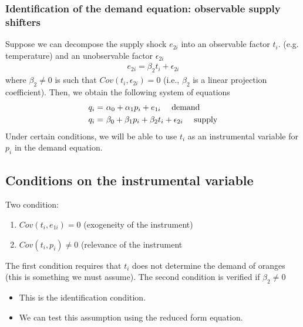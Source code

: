 \documentclass[a4paper,twoside,11pt]{article}
\begin{document}
\subsubsection{Identification of the demand equation: observable supply shifters}
Suppose we can decompose the supply shock $e_{2i}$ into an observable factor $t_i$. (e.g. temperature) and an unobservable factor $\epsilon_{2i}$
\begin{equation*}
\begin{aligned}
e_{2i} = \beta_2 t_i + \epsilon_{2i}
\end{aligned} 
\end{equation*}
where $\beta_2 \ne 0$ is such that $Cov(t_i, \epsilon_{2i}) =0$ (i.e., $\beta_2$ is a linear projection
coefficient).
\newline
\newline
Then, we obtain the following system of equations
\begin{equation*}
\begin{aligned}
q_i =& \ \alpha_0 + \alpha_1 p_i + e_{1i} \ \ \ \ \textmd{demand} \\
q_i =& \ \beta_0 + \beta_1 p_i + \beta_2 t_i + \epsilon_{2i} \ \ \ \ \textmd{supply}
\end{aligned} 
\end{equation*}
Under certain conditions, we will be able to use $t_i$ as an instrumental variable for $p_i$ in the demand equation.
\subsection{Conditions on the instrumental variable}
\begin{shaded*}
\noindent Two condition:
\begin{enumerate}
    \item $Cov(t_i, e_{1i}) =0$ (exogeneity of the instrument)
    \item $Cov(t_i,p_i) \ne 0$ (relevance of the instrument
\end{enumerate}
The first condition requires that $t_i$ does not determine the demand of oranges (this is something we must assume).
\newline
\newline
The second condition is verified if $\beta_2 \ne 0$
\begin{itemize}
    \item This is the identification condition.
    \item We can test this assumption using the reduced form equation.
\end{itemize}
\end{shaded*}
\end{document}
